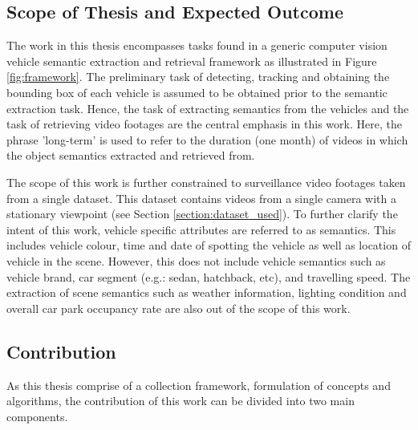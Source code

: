 \subsection{Scope of Thesis and Expected Outcome}
\label{subsec:scope}
The work in this thesis encompasses tasks found in a generic computer vision vehicle semantic extraction and retrieval framework as illustrated in Figure \ref{fig:framework}. The preliminary task of detecting, tracking and obtaining the bounding box of each vehicle is assumed to be obtained prior to the semantic extraction task. Hence, the task of extracting semantics from the vehicles and the task of retrieving video footages are the central emphasis in this work. Here, the phrase 'long-term' is used to refer to the duration (one month) of videos in which the object semantics extracted and retrieved from. 

The scope of this work is further constrained to surveillance video footages taken from a single dataset. This dataset contains videos from a single camera with a stationary viewpoint (see Section \ref{section:dataset_used}). To further clarify the intent of this work, vehicle specific attributes are referred to as semantics. This includes vehicle colour, time and date of spotting the vehicle as well as location of vehicle in the scene. However, this does not include vehicle semantics such as vehicle brand, car segment (e.g.: sedan, hatchback, etc), and travelling speed. The extraction of scene semantics such as weather information, lighting condition and overall car park occupancy rate are also out of the scope of this work.



\subsection{Contribution}
As this thesis comprise of a collection framework, formulation of concepts and algorithms, the contribution of this work can be divided into two main components. 


